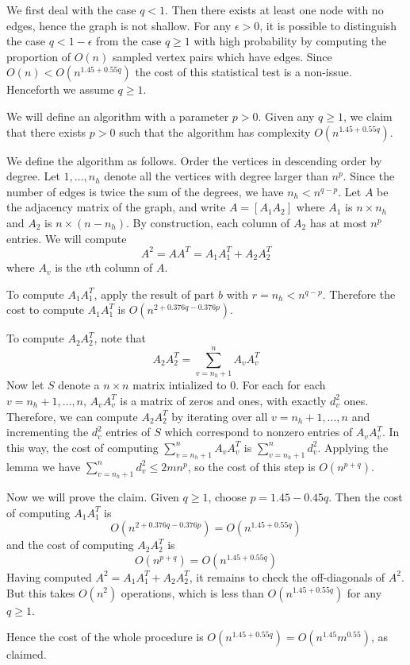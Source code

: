 \documentclass[11pt]{article}
\begin{document}
We first deal with the case $q < 1$.  Then there exists at least one
node with no edges, hence the graph is not shallow.  For any $\epsilon
> 0$, it is possible to distinguish the case $q < 1 - \epsilon$ from
the case $q \geq 1$ with high probability by computing the proportion
of $O(n)$ sampled vertex pairs which have edges.  Since $O(n) <
O(n^{1.45 + 0.55q})$ the cost of this statistical test is a non-issue.
Henceforth we assume $q \geq 1$.

We will define an algorithm with a parameter $p > 0$.  Given any $q
\geq 1$, we claim that there exists $p > 0$ such that the algorithm
has complexity $O(n^{1.45 + 0.55q})$.

We define the algorithm as follows.  Order the vertices in descending
order by degree.  Let $1,\hdots, n_h$ denote all the vertices with
degree larger than $n^p$.  Since the number of edges is twice the sum
of the degrees, we have $n_h < n^{q-p}$.  Let $A$ be the adjacency
matrix of the graph, and write $A = [A_1 A_2]$ where $A_1$ is $n
\times n_h$ and $A_2$ is $n \times (n-n_h)$.  By construction, each
column of $A_2$ has at most $n^p$ entries.  We will compute
\[
A^2 = AA^T = A_1 A_1^T + A_2 A_2^T
\]
where $A_v$ is the $v$th column of $A$.

To compute $A_1 A_1^T$, apply the result of part $b$ with $r = n_h <
n^{q-p}$.  Therefore the cost to compute $A_1 A_1^T$ is
$O(n^{2 +0.376q-0.376p})$.

To compute $A_2 A_2^T$, note that
\[A_2 A_2^T = \sum_{v = n_h + 1}^n A_v A_v^T\]
Now let $S$ denote a $n \times n$ matrix intialized to $0$.  For each
for each $v = n_h+1,\hdots, n$, $A_v A_v^T$ is a matrix of zeros and
ones, with exactly $d_v^2$ ones.  Therefore, we can compute $A_2
A_2^T$ by iterating over all $v = n_h + 1,\hdots, n$ and incrementing
the $d_v^2$ entries of $S$ which correspond to nonzero entries of $A_v
A_v^T$.  In this way, the cost of computing $\sum_{v = n_h + 1}^n A_v
A_v^T$ is $\sum_{v = n_h + 1}^n d_v^2$.  Applying the lemma we have
$\sum_{v = n_h + 1}^n d_v^2 \leq 2 m n^p$, so the cost of this step is
$O(n^{p+q})$.

Now we will prove the claim. Given $q \geq 1$, choose $p = 1.45 - 0.45 q$.
Then the cost of computing $A_1 A_1^T$ is 
\[
O(n^{2 + 0.376q-0.376p}) = O(n^{1.45 + 0.55 q})
\]
and the cost of computing $A_2 A_2^T$ is
\[
O(n^{p + q}) = O(n^{1.45 + 0.55q})
\]
Having computed $A^2 = A_1 A_1^T + A_2 A_2^T$, it remains to check the
off-diagonals of $A^2$.  But this takes $O(n^2)$ operations, which is
less than $O(n^{1.45 + 0.55q})$ for any $q \geq 1$.

Hence the cost of the whole procedure is $O(n^{1.45 + 0.55q}) =
O(n^{1.45} m^{0.55})$, as claimed.
\end{document}
